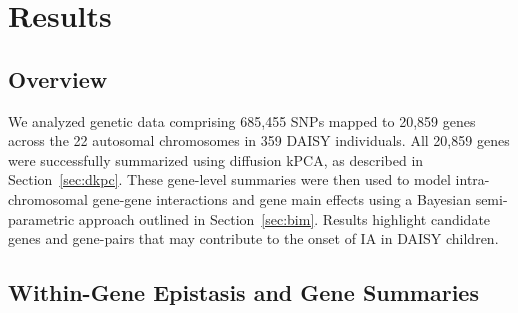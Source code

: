 \documentclass{article}\usepackage[]{graphicx}\usepackage[]{color}
\begin{document}






\section{Results}
\label{sec:res}
\subsection{Overview}
\label{sec:res-over}
We analyzed genetic data comprising 685,455 SNPs mapped to 20,859 genes across the 22 autosomal chromosomes in 359 DAISY individuals. All 20,859 genes were successfully summarized using diffusion kPCA, as described in Section~\ref{sec:dkpc}. These gene-level summaries were then used to model intra-chromosomal gene-gene interactions and gene main effects using a Bayesian semi-parametric approach outlined in Section~\ref{sec:bim}. Results highlight candidate genes and gene-pairs that may contribute to the onset of IA in DAISY children. 

\subsection{Within-Gene Epistasis and Gene Summaries}
\label{sec:res-within}
\end{document}
